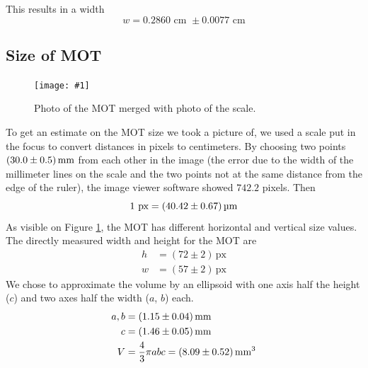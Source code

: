 \documentclass[twocolumn]{article}
\newcommand{\insertFigure}[1]{%
   \texttt{[image: \#1]}%
}
\begin{document}
This results in a width %
\begin{equation}
w = 0.2860 \text{ cm } \pm 0.0077 \text{ cm} \nonumber
\end{equation}
\subsection{Size of MOT}
\begin{figure}
\centering
\insertFigure{Images/MOT_w_scale_crop.png}
\caption{Photo of the MOT merged with photo of the scale.}
\label{fig:mot_w_scale}
\end{figure}
To get an estimate on the MOT size we took a picture of, we used a scale put in the focus to convert distances in pixels to centimeters. By choosing two points $\SI[separate-uncertainty = true]{30.0 \pm 0.5 }{\milli\meter}$ from each other in the image (the error due to the width of the millimeter lines on the scale and the two points not at the same distance from the edge of the ruler), the image viewer software showed $742.2$ pixels. Then
\begin{equation}
1 \text{~px} = \SI[separate-uncertainty = true]{40.42 \pm 0.67}{\micro\meter} \nonumber
\end{equation}
As visible on Figure \ref{fig:mot_w_scale}, the MOT has different horizontal and vertical size values. The directly measured width and height for the MOT are
\begin{align*}
h &= (72 \pm 2)  \, \text{px}\\
w &= (57 \pm 2)  \, \text{px} 
\end{align*}
We chose to approximate the volume by an ellipsoid with one axis half the height ($c$) and two axes half the width ($a$, $b$) each.
\begin{align*}
a, b &= \SI[separate-uncertainty = true]{1.15 \pm 0.04}{\milli\meter} \\
c &=  \SI[separate-uncertainty = true]{1.46 \pm 0.05}{\milli\meter} \\
V &= \frac{4}{3} \pi a b c = \SI[separate-uncertainty = true]{8.09 \pm 0.52 }{\cubic\milli\meter}
\end{align*}
\end{document}
